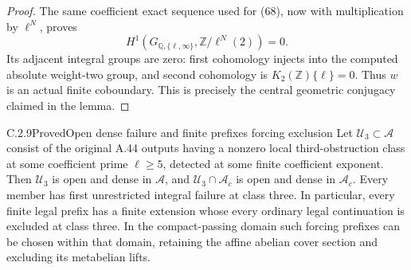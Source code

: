 \begin{proof}
The same coefficient exact sequence used for (68),
now with multiplication by \(\ell^N\), proves
\[
 H^1(G_{\mathbb Q,\{\ell,\infty\}},
                       \mathbb Z/\ell^N(2))=0.
\]
Its adjacent integral groups are zero: first
cohomology injects into the computed absolute
weight-two group, and second cohomology is
\(K_2(\mathbb Z)\{\ell\}=0\).
Thus \(w\) is an actual finite coboundary.
This is precisely the central geometric conjugacy
claimed in the lemma.
\end{proof}

\begin{result}{C.2.9}{Proved}{Open dense failure and finite prefixes forcing exclusion}
\label{cor:ghost-open-dense-class3}
Let \(\mathscr U_3\subset\mathscr A\) consist of
the original A.44 outputs having a nonzero local
third-obstruction class at some coefficient prime
\(\ell\ge5\), detected at some finite coefficient
exponent. Then \(\mathscr U_3\) is open and dense
in \(\mathscr A\), and
\(\mathscr U_3\cap\mathscr A_c\) is open and
dense in \(\mathscr A_c\).
Every member has first unrestricted integral
failure at class three. In particular, every finite
legal prefix has a finite extension whose every
ordinary legal continuation is excluded at class
three. In the compact-passing domain such forcing
prefixes can be chosen within that domain, retaining
the affine abelian cover section and excluding its
metabelian lifts.
\end{result}
